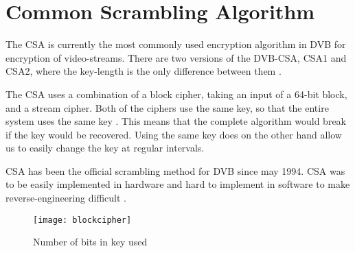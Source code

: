 \chapter{Common Scrambling Algorithm} \label{ch:CSA}
The CSA is currently the most commonly used encryption algorithm in DVB for 
encryption of video-streams. There are two versions of the DVB-CSA, CSA1 and 
CSA2, where the key-length is the only difference between them 
\citep[p. 23]{DVBScene:2013}. 

The CSA uses a combination of a block cipher, taking an input of a 64-bit block, 
and a stream cipher. Both of the ciphers use the same key, so that the entire 
system uses the same key \citep[pp. 271--272]{WeiLi:2007}. This means that the 
complete algorithm would break if the key would be recovered. Using the same key 
does on the other hand allow us to easily change the key at regular intervals. 

CSA has been the official scrambling method for DVB since may 1994. CSA was 
to be easily implemented in hardware and hard to implement in software to make 
reverse-engineering difficult \citep{DVBScene:2013}.




\begin{figure}
  \begin{center}
    \texttt{[image: blockcipher]}
  \end{center}
  \caption{Number of bits in key used}
  \label{fig:blockcipher}
\end{figure}

